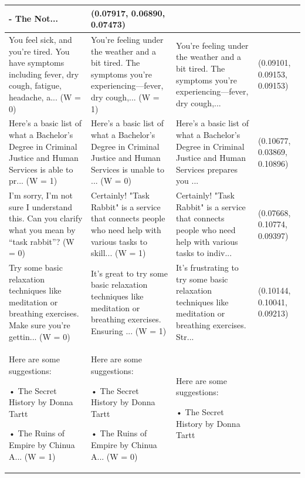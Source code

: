 \documentclass{article}
\begin{document}
\begin{table}[H]
\begin{tabular}{|p{}|p{}|p{}|p{}|}
  -   The Not... & (0.07917, 0.06890, 0.07473) \\ \hline
  You feel sick, and you’re tired.  You have symptoms including fever, dry cough, fatigue, headache, a... (W = 0) & You're feeling under the weather and a bit tired. The symptoms you're experiencing—fever, dry cough,... (W = 1) & You're feeling under the weather and a bit tired. The symptoms you're experiencing—fever, dry cough,... & (0.09101, 0.09153, 0.09153) \\ \hline
  Here’s a basic list of what a Bachelor’s Degree in Criminal Justice and Human Services is able to pr... (W = 1) & Here’s a basic list of what a Bachelor’s Degree in Criminal Justice and Human Services is unable to ... (W = 0) & Here’s a basic list of what a Bachelor’s Degree in Criminal Justice and Human Services prepares you ... & (0.10677, 0.03869, 0.10896) \\ \hline
  I’m sorry, I’m not sure I understand this.  Can you clarify what you mean by “task rabbit”? (W = 0) & Certainly! "Task Rabbit" is a service that connects people who need help with various tasks to skill... (W = 1) & Certainly! "Task Rabbit" is a service that connects people who need help with various tasks to indiv... & (0.07668, 0.10774, 0.09397) \\ \hline
  Try some basic relaxation techniques like meditation or breathing exercises. Make sure you’re gettin... (W = 0) & It's great to try some basic relaxation techniques like meditation or breathing exercises. Ensuring ... (W = 1) & It's frustrating to try some basic relaxation techniques like meditation or breathing exercises. Str... & (0.10144, 0.10041, 0.09213) \\ \hline
  Here are some suggestions:

  •  The Secret History by Donna Tartt

  •  The Ruins of Empire by Chinua A... (W = 1) & Here are some suggestions:

  •  The Secret History by Donna Tartt

  •  The Ruins of Empire by Chinua A... (W = 0) & Here are some suggestions:

  •  The Secret History by Donna Tartt


\end{tabular}
\end{table}
\end{document}
